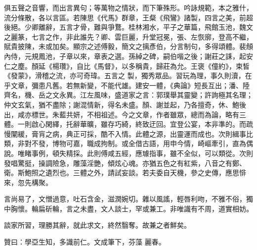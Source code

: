 \begin{pinyinscope}
 俱五聲之音響，而出言異句；等萬物之情狀，而下筆殊形。吟詠規範，本之雅什，流分條散，各以言區。若陳思《代馬》群章，王粲《飛鸞》諸製，四言之美，前超後絕。少卿離辭，五言才骨，難與爭鶩。桂林湘水，平子之華篇，飛館玉池，魏文之麗篆，七言之作，非此誰先？卿、雲巨麗，升堂冠冕，張、左恢廓，登高不繼，賦貴披陳，未或加矣。顯宗之述傅毅，簡文之摛彥伯，分言制句，多得頌體。裴頠內侍，元規鳳池，子章以來，章表之選。孫綽之碑，嗣伯喈之後；謝莊之誄，起安仁之塵。顏延《楊瓚》，自比《馬督》，以多稱貴，歸莊為允。王褒《僮約》，束皙《發蒙》，滑稽之流，亦可奇瑋。五言之
 製，獨秀眾品。習玩為理，事久則瀆，在乎文章，彌患凡舊。若無新變，不能代雄。建安一體，《典論》短長互出；潘、陸齊名，機、岳之文永異。江左風味，盛道家之言：郭璞舉其靈變；許詢極其名理；仲文玄氣，猶不盡除；謝混情新，得名未盛。顏、謝並起，乃各擅奇，休、鮑後出，咸亦標世。朱藍共妍，不相祖述。今之文章，作者雖眾，總而為論，略有三體。一則啟心閑繹，托辭華曠，雖存巧綺，終致迂回。宜登公宴，本非準的。而疏慢闡緩，膏肓之病，典正可採，酷不入情。此體之源，出靈運而成也。次則緝事比類，非對不發，博物可嘉，職成拘制。或全借古語，用申今情，崎嶇牽引，直為偶說。唯睹事例，頓失精採。此則傅咸五經，應璩指事，雖不全似，可以類從。次則發唱驚挺，操調險急，雕藻淫艷，傾炫心魂。亦猶五色之有紅紫，八音之有鄭、衛。斯鮑照之遺烈也。三體之外，請試妄談。若夫委自天機，參之史傳，應思悱
 來，忽先構聚。



 言尚易了，文憎過意，吐石含金，滋潤婉切。雜以風謠，輕唇利吻，不雅不俗，獨中胸懷。輪扁斫輪，言之未盡，文人談士，罕或兼工。非唯識有不周，道實相妨。



 談家所習，理勝其辭，就此求文，終然翳奪。故兼之者鮮矣。



 贊曰：學亞生知，多識前仁。文成筆下，芬藻
 麗春。



\end{pinyinscope}